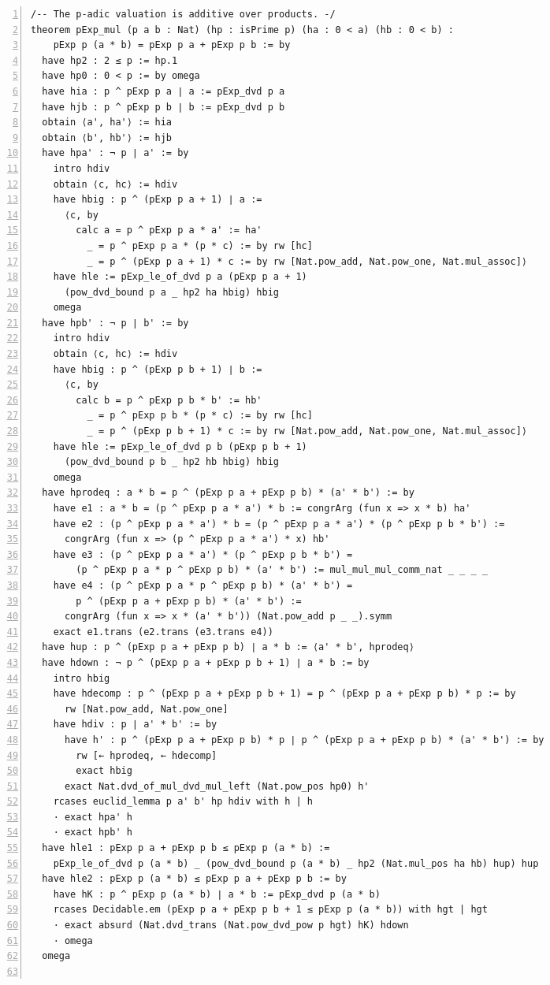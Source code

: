 \documentclass[10pt]{article}
\newcommand{\leansize}{\fontsize{5.5pt}{6.75pt}\selectfont}
\begin{document}
\begin{multicols}{2}
\begin{Verbatim}[numbers=left,firstnumber=1,numbersep=3pt,xleftmargin=2.6em,breaklines=true,breakanywhere=true,breakautoindent=false,breakindent=1.4em,breaksymbolleft={},breakanywheresymbolpre={},fontsize=\leansize]
/-- The p-adic valuation is additive over products. -/
theorem pExp_mul (p a b : Nat) (hp : isPrime p) (ha : 0 < a) (hb : 0 < b) :
    pExp p (a * b) = pExp p a + pExp p b := by
  have hp2 : 2 ≤ p := hp.1
  have hp0 : 0 < p := by omega
  have hia : p ^ pExp p a ∣ a := pExp_dvd p a
  have hjb : p ^ pExp p b ∣ b := pExp_dvd p b
  obtain ⟨a', ha'⟩ := hia
  obtain ⟨b', hb'⟩ := hjb
  have hpa' : ¬ p ∣ a' := by
    intro hdiv
    obtain ⟨c, hc⟩ := hdiv
    have hbig : p ^ (pExp p a + 1) ∣ a :=
      ⟨c, by
        calc a = p ^ pExp p a * a' := ha'
          _ = p ^ pExp p a * (p * c) := by rw [hc]
          _ = p ^ (pExp p a + 1) * c := by rw [Nat.pow_add, Nat.pow_one, Nat.mul_assoc]⟩
    have hle := pExp_le_of_dvd p a (pExp p a + 1)
      (pow_dvd_bound p a _ hp2 ha hbig) hbig
    omega
  have hpb' : ¬ p ∣ b' := by
    intro hdiv
    obtain ⟨c, hc⟩ := hdiv
    have hbig : p ^ (pExp p b + 1) ∣ b :=
      ⟨c, by
        calc b = p ^ pExp p b * b' := hb'
          _ = p ^ pExp p b * (p * c) := by rw [hc]
          _ = p ^ (pExp p b + 1) * c := by rw [Nat.pow_add, Nat.pow_one, Nat.mul_assoc]⟩
    have hle := pExp_le_of_dvd p b (pExp p b + 1)
      (pow_dvd_bound p b _ hp2 hb hbig) hbig
    omega
  have hprodeq : a * b = p ^ (pExp p a + pExp p b) * (a' * b') := by
    have e1 : a * b = (p ^ pExp p a * a') * b := congrArg (fun x => x * b) ha'
    have e2 : (p ^ pExp p a * a') * b = (p ^ pExp p a * a') * (p ^ pExp p b * b') :=
      congrArg (fun x => (p ^ pExp p a * a') * x) hb'
    have e3 : (p ^ pExp p a * a') * (p ^ pExp p b * b') =
        (p ^ pExp p a * p ^ pExp p b) * (a' * b') := mul_mul_mul_comm_nat _ _ _ _
    have e4 : (p ^ pExp p a * p ^ pExp p b) * (a' * b') =
        p ^ (pExp p a + pExp p b) * (a' * b') :=
      congrArg (fun x => x * (a' * b')) (Nat.pow_add p _ _).symm
    exact e1.trans (e2.trans (e3.trans e4))
  have hup : p ^ (pExp p a + pExp p b) ∣ a * b := ⟨a' * b', hprodeq⟩
  have hdown : ¬ p ^ (pExp p a + pExp p b + 1) ∣ a * b := by
    intro hbig
    have hdecomp : p ^ (pExp p a + pExp p b + 1) = p ^ (pExp p a + pExp p b) * p := by
      rw [Nat.pow_add, Nat.pow_one]
    have hdiv : p ∣ a' * b' := by
      have h' : p ^ (pExp p a + pExp p b) * p ∣ p ^ (pExp p a + pExp p b) * (a' * b') := by
        rw [← hprodeq, ← hdecomp]
        exact hbig
      exact Nat.dvd_of_mul_dvd_mul_left (Nat.pow_pos hp0) h'
    rcases euclid_lemma p a' b' hp hdiv with h | h
    · exact hpa' h
    · exact hpb' h
  have hle1 : pExp p a + pExp p b ≤ pExp p (a * b) :=
    pExp_le_of_dvd p (a * b) _ (pow_dvd_bound p (a * b) _ hp2 (Nat.mul_pos ha hb) hup) hup
  have hle2 : pExp p (a * b) ≤ pExp p a + pExp p b := by
    have hK : p ^ pExp p (a * b) ∣ a * b := pExp_dvd p (a * b)
    rcases Decidable.em (pExp p a + pExp p b + 1 ≤ pExp p (a * b)) with hgt | hgt
    · exact absurd (Nat.dvd_trans (Nat.pow_dvd_pow p hgt) hK) hdown
    · omega
  omega


\end{Verbatim}
\end{multicols}
\end{document}
